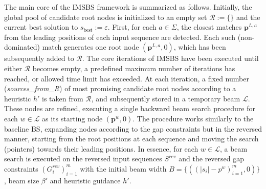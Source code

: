 \documentclass[runningheads]{llncs}
\begin{document}
The main core of the IMSBS framework is summarized as follows. %
Initially, the global pool of candidate root nodes is initialized to an empty set $\mathcal{R}:=\{\}$ and the current best solution to $s_{\mathrm{best}}:= \varepsilon$. First, for each $a \in \Sigma$, the closest matches $\mathbf{p}^{L, a}$ from the leading positions of each input sequence are detected. Each such (non-dominated) match generates one root node $(\mathbf{p}^{L, a}, 0)$, which has been subsequently added to $\mathcal{R}$.  The core iterations of IMSBS have been executed until either  $\mathcal{R}$ becomes empty, a predefined maximum number of iterations has reached, or allowed time limit has exceeded. At each iteration, a fixed number (\emph{sources\_from\_R}) of most promising candidate root nodes according to a heuristic $h'$ is taken from $\mathcal{R}$, and subsequently stored in a temporary beam $\mathcal{L}$.  These nodes are refined, executing a single backward beam search procedure for each $w \in \mathcal{L}$ as its starting node $(\mathbf{p}^w, 0)$. The procedure works similarly to the baseline BS,  expanding nodes according to the gap constraints but in the reversed manner, starting from the root positions at each sequence and moving the search (pointers) towards their leading positions. In essence, for each $w \in \mathcal{L}$, a beam search  %
 is executed on the reversed input sequences $S^{rev}$ and the reversed gap constraints $(G_i^{rev})_{i=1}^m$ with the initial beam width $B=\{ ((|s_i|-p^w)_{i=1}^m, 0) \}$, beam size $\beta'$ and heuristic guidance $h'$.   %
\end{document}
